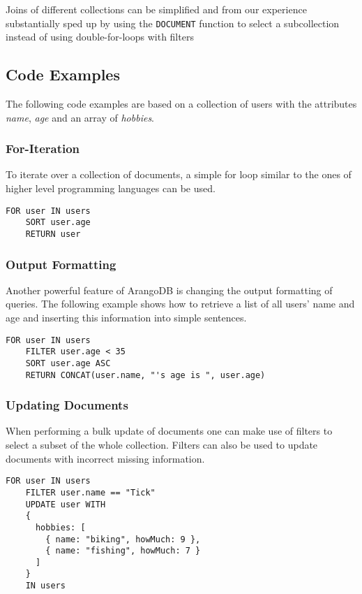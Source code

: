 Joins of different collections can be simplified and from our experience substantially sped up by using the \texttt{DOCUMENT} function to select a subcollection instead of using double-for-loops with filters

\subsection{Code Examples}
The following code examples are based on a collection of users with the attributes \textit{name}, \textit{age} and an array of \textit{hobbies}.

\subsubsection{For-Iteration}

To iterate over a collection of documents, a simple for loop similar to the ones of higher level programming languages can be used.

\begin{lstlisting}[language=ArangoQL]
  FOR user IN users
    SORT user.age
    RETURN user
\end{lstlisting}

\subsubsection{Output Formatting}

Another powerful feature of ArangoDB is changing the output formatting of queries. The following example shows how to retrieve a list of all users' name and age and inserting this information into simple sentences.

\begin{lstlisting}[language=ArangoQL]
  FOR user IN users
    FILTER user.age < 35
    SORT user.age ASC
    RETURN CONCAT(user.name, "'s age is ", user.age)
\end{lstlisting}

\subsubsection{Updating Documents}

When performing a bulk update of documents one can make use of filters to select a subset of the whole collection. Filters can also be used to update documents with incorrect missing information.

\begin{lstlisting}[language=ArangoQL]
  FOR user IN users
    FILTER user.name == "Tick"
    UPDATE user WITH
    {
      hobbies: [
        { name: "biking", howMuch: 9 },
        { name: "fishing", howMuch: 7 }
      ]
    }
    IN users
\end{lstlisting}

